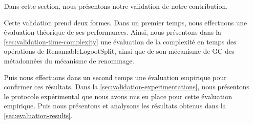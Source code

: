 Dans cette section, nous présentons notre validation de notre contribution.

Cette validation prend deux formes.
Dans un premier temps, nous effectuons une évaluation théorique de ses performances.
Ainsi, nous présentons dans la \autoref{sec:validation-time-complexity} une évaluation de la complexité en temps des opérations de RenamableLogootSplit, ainsi que de son mécanisme de \ac{GC} des métadonnées du mécanisme de renommage.

Puis nous effectuons dans un second temps une évaluation empirique pour confirmer ces résultats.
Dans la \autoref{sec:validation-experimentations}, nous présentons le protocole expérimental que nous avons mis en place pour cette évaluation empirique.
Puis nous présentons et analysons les résultats obtenus dans la \autoref{sec:evaluation-results}.
